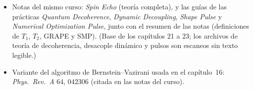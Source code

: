 \begin{itemize}
    \emph{Variational Quantum Eigensolver} y 2.8 \emph{Quantum Approximate
    Optimization Algorithm}. (Base de los capítulos 18 a 20.) Las notas citan
    a Harrow, Hassidim y Lloyd (2009) para HHL y a Farhi, Goldstone y Gutmann
    (2014) para QAOA.
  \item Notas del mismo curso: \emph{Spin Echo} (teoría completa), y las guías de
    las prácticas \emph{Quantum Decoherence}, \emph{Dynamic Decoupling},
    \emph{Shape Pulse} y \emph{Numerical Optimization Pulse}, junto con el
    resumen de las notas (definiciones de $T_1$, $T_2$, GRAPE y SMP). (Base de
    los capítulos 21 a 23; los archivos de teoría de decoherencia, desacople
    dinámico y pulsos son escaneos sin texto legible.)
  \item Variante del algoritmo de Bernstein--Vazirani usada en el capítulo~16:
    \emph{Phys.\ Rev.\ A} 64, 042306 (citada en las notas del curso).
\end{itemize}
\ifdefined\enmain\else\fi
